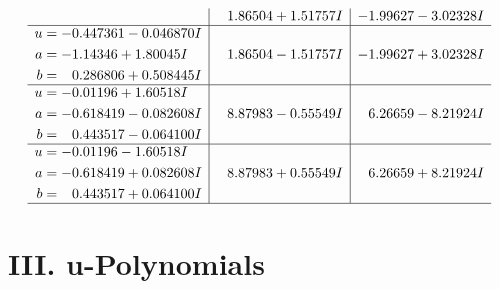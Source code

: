 \documentclass[1p]{elsarticle_modified}
\theoremstyle{definition}
\begin{document}
$$\begin{array}{c|c|c}
 & \phantom{-}1.86504 + 1.51757 I & -1.99627 - 3.02328 I \\ \hline\begin{aligned}
u &= -0.447361 - 0.046870 I \\
a &= -1.14346 + 1.80045 I \\
b &= \phantom{-}0.286806 + 0.508445 I\end{aligned}
 & \phantom{-}1.86504 - 1.51757 I & -1.99627 + 3.02328 I \\ \hline\begin{aligned}
u &= -0.01196 + 1.60518 I \\
a &= -0.618419 - 0.082608 I \\
b &= \phantom{-}0.443517 - 0.064100 I\end{aligned}
 & \phantom{-}8.87983 - 0.55549 I & \phantom{-}6.26659 - 8.21924 I \\ \hline\begin{aligned}
u &= -0.01196 - 1.60518 I \\
a &= -0.618419 + 0.082608 I \\
b &= \phantom{-}0.443517 + 0.064100 I\end{aligned}
 & \phantom{-}8.87983 + 0.55549 I & \phantom{-}6.26659 + 8.21924 I\\
 \hline 
 \end{array}$$\newpage
\newpage\renewcommand{\arraystretch}{1}
\centering \section*{ III. u-Polynomials}
\end{document}
